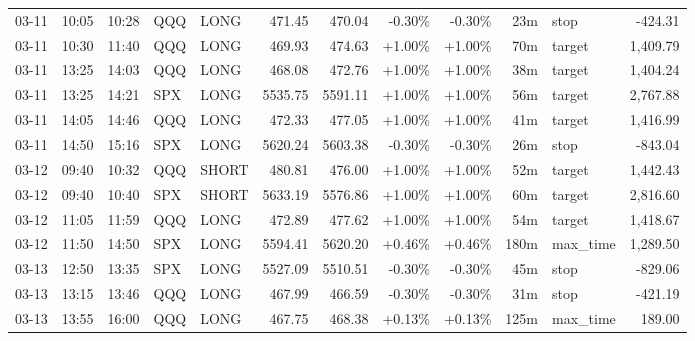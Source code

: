 \documentclass[11pt,a4paper]{article}
\begin{document}
\begin{center}
\begin{longtable}{>{\color{txtmain}}l l l l l r r r r r >{\color{txtmain}}l r}
03-11 & 10:05 & 10:28 & QQQ & LONG & 471.45 & 470.04 & \textcolor{lossred}{-0.30\%} & \textcolor{lossred}{-0.30\%} & 23m & stop & \textcolor{lossred}{-424.31} \\
03-11 & 10:30 & 11:40 & QQQ & LONG & 469.93 & 474.63 & \textcolor{wingreen}{+1.00\%} & \textcolor{wingreen}{+1.00\%} & 70m & target & \textcolor{wingreen}{1,409.79} \\
03-11 & 13:25 & 14:03 & QQQ & LONG & 468.08 & 472.76 & \textcolor{wingreen}{+1.00\%} & \textcolor{wingreen}{+1.00\%} & 38m & target & \textcolor{wingreen}{1,404.24} \\
03-11 & 13:25 & 14:21 & SPX & LONG & 5535.75 & 5591.11 & \textcolor{wingreen}{+1.00\%} & \textcolor{wingreen}{+1.00\%} & 56m & target & \textcolor{wingreen}{2,767.88} \\
03-11 & 14:05 & 14:46 & QQQ & LONG & 472.33 & 477.05 & \textcolor{wingreen}{+1.00\%} & \textcolor{wingreen}{+1.00\%} & 41m & target & \textcolor{wingreen}{1,416.99} \\
03-11 & 14:50 & 15:16 & SPX & LONG & 5620.24 & 5603.38 & \textcolor{lossred}{-0.30\%} & \textcolor{lossred}{-0.30\%} & 26m & stop & \textcolor{lossred}{-843.04} \\
03-12 & 09:40 & 10:32 & QQQ & SHORT & 480.81 & 476.00 & \textcolor{wingreen}{+1.00\%} & \textcolor{wingreen}{+1.00\%} & 52m & target & \textcolor{wingreen}{1,442.43} \\
03-12 & 09:40 & 10:40 & SPX & SHORT & 5633.19 & 5576.86 & \textcolor{wingreen}{+1.00\%} & \textcolor{wingreen}{+1.00\%} & 60m & target & \textcolor{wingreen}{2,816.60} \\
03-12 & 11:05 & 11:59 & QQQ & LONG & 472.89 & 477.62 & \textcolor{wingreen}{+1.00\%} & \textcolor{wingreen}{+1.00\%} & 54m & target & \textcolor{wingreen}{1,418.67} \\
03-12 & 11:50 & 14:50 & SPX & LONG & 5594.41 & 5620.20 & \textcolor{wingreen}{+0.46\%} & \textcolor{wingreen}{+0.46\%} & 180m & max\_time & \textcolor{wingreen}{1,289.50} \\
03-13 & 12:50 & 13:35 & SPX & LONG & 5527.09 & 5510.51 & \textcolor{lossred}{-0.30\%} & \textcolor{lossred}{-0.30\%} & 45m & stop & \textcolor{lossred}{-829.06} \\
03-13 & 13:15 & 13:46 & QQQ & LONG & 467.99 & 466.59 & \textcolor{lossred}{-0.30\%} & \textcolor{lossred}{-0.30\%} & 31m & stop & \textcolor{lossred}{-421.19} \\
03-13 & 13:55 & 16:00 & QQQ & LONG & 467.75 & 468.38 & \textcolor{wingreen}{+0.13\%} & \textcolor{wingreen}{+0.13\%} & 125m & max\_time & \textcolor{wingreen}{189.00} \\

\end{longtable}
\end{center}
\end{document}
